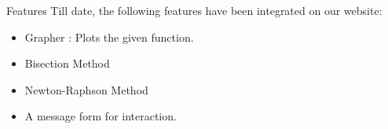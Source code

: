
\begin{frame}{Features}
Till date, the following features have been integrated on our website:
\begin{itemize}
    \item Grapher : Plots the given function.
    \item Bisection Method
    \item Newton-Raphson Method
    \item A message form for interaction.
\end{itemize}
\end{frame}
